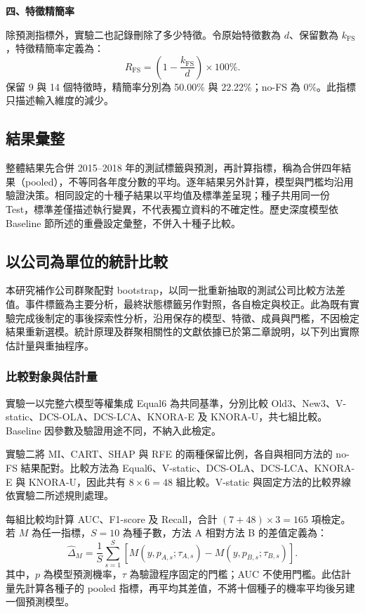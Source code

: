 \textbf{四、特徵精簡率}

除預測指標外，實驗二也記錄刪除了多少特徵。令原始特徵數為 \(d\)、保留數為 \(k_{\mathrm{FS}}\)，特徵精簡率定義為：
\begin{equation}\label{eq:method-reduction}
R_{\mathrm{FS}}=\left(1-\frac{k_{\mathrm{FS}}}{d}\right)\times100\%.
\end{equation}
保留 9 與 14 個特徵時，精簡率分別為 50.00\% 與 22.22\%；no-FS 為 0\%。此指標只描述輸入維度的減少。

\subsection{結果彙整}

整體結果先合併 2015--2018 年的測試標籤與預測，再計算指標，稱為合併四年結果（pooled），不等同各年度分數的平均。逐年結果另外計算，模型與門檻均沿用驗證決策。相同設定的十種子結果以平均值及標準差呈現；種子共用同一份 Test，標準差僅描述執行變異，不代表獨立資料的不確定性。歷史深度模型依 Baseline 節所述的重疊設定彙整，不併入十種子比較。

\subsection{以公司為單位的統計比較}\label{sec:method-statistics}

本研究補作公司群聚配對 bootstrap，以同一批重新抽取的測試公司比較方法差值。事件標籤為主要分析，最終狀態標籤另作對照，各自檢定與校正。此為既有實驗完成後制定的事後探索性分析，沿用保存的模型、特徵、成員與門檻，不因檢定結果重新選模。統計原理及群聚相關性的文獻依據已於第二章說明，以下列出實際估計量與重抽程序。

\subsubsection{比較對象與估計量}

實驗一以完整六模型等權集成 Equal6 為共同基準，分別比較 Old3、New3、V-static、DCS-OLA、DCS-LCA、KNORA-E 及 KNORA-U，共七組比較。Baseline 因參數及驗證用途不同，不納入此檢定。

實驗二將 MI、CART、SHAP 與 RFE 的兩種保留比例，各自與相同方法的 no-FS 結果配對。比較方法為 Equal6、V-static、DCS-OLA、DCS-LCA、KNORA-E 與 KNORA-U，因此共有 \(8\times6=48\) 組比較。V-static 與固定方法的比較界線依實驗二所述規則處理。

每組比較均計算 AUC、F1-score 及 Recall，合計 \((7+48)\times3=165\) 項檢定。若 \(M\) 為任一指標，\(S=10\) 為種子數，方法 A 相對方法 B 的差值定義為：
\begin{equation}\label{eq:stats-difference}
\widehat{\Delta}_M=\frac{1}{S}\sum_{s=1}^{S}
\left[M(y,p_{A,s};\tau_{A,s})-M(y,p_{B,s};\tau_{B,s})\right].
\end{equation}
其中，\(p\) 為模型預測機率，\(\tau\) 為驗證程序固定的門檻；AUC 不使用門檻。此估計量先計算各種子的 pooled 指標，再平均其差值，不將十個種子的機率平均後另建一個預測模型。

